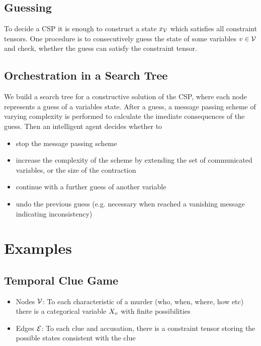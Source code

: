 \documentclass[aps,onecolumn,nofootinbib,pra]{article}
\begin{document}
\subsection{Guessing}

To decide a CSP it is enough to construct a state $x_{\mathcal{V}}$ which satisfies all constraint tensors.
One procedure is to consecutively guess the state of some variables $v\in\mathcal{V}$ and check, whether the guess can satisfy the constraint tensor.

\subsection{Orchestration in a Search Tree}

We build a search tree for a constructive solution of the CSP, where each node represents a guess of a variables state.
After a guess, a message passing scheme of varying complexity  is performed to calculate the imediate consequences of the guess.
Then an intelligent agent decides whether to
\begin{itemize}
	\item stop the message passing scheme
	\item increase the complexity of the scheme by extending the set of communicated variables, or the size of the contraction
	\item continue with a further guess of another variable
	\item undo the previous guess (e.g. necessary when reached a vanishing message indicating inconsistency)
\end{itemize}


\section{Examples}

\subsection{Temporal Clue Game}

\begin{itemize}
	\item Nodes $\mathcal{V}$: To each characteristic of a murder (who, when, where, how etc) there is a categorical variable $X_{v}$ with finite possibilities
	\item Edges $\mathcal{E}$: To each clue and accusation, there is a constraint tensor storing the possible states consistent with the clue
\end{itemize}
\end{document}
